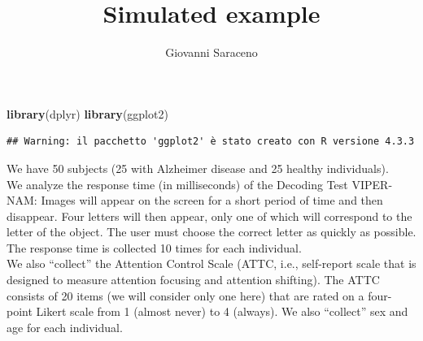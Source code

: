 \documentclass[
]{article}
\title{Simulated example}
\author{Giovanni Saraceno}
\date{}
\newenvironment{Shaded}{\begin{snugshade}}{\end{snugshade}}
\newcommand{\FunctionTok}[1]{\textcolor[rgb]{0.13,0.29,0.53}{\textbf{#1}}}
\newcommand{\NormalTok}[1]{#1}
\begin{document}
\maketitle

{
\setcounter{tocdepth}{2}
\tableofcontents
}
\begin{Shaded}
\begin{Highlighting}[]
\FunctionTok{library}\NormalTok{(dplyr)}
\FunctionTok{library}\NormalTok{(ggplot2)}
\end{Highlighting}
\end{Shaded}

\begin{verbatim}
## Warning: il pacchetto 'ggplot2' è stato creato con R versione 4.3.3
\end{verbatim}

We have 50 subjects (25 with Alzheimer disease and 25 healthy
individuals).\\
We analyze the response time (in milliseconds) of the Decoding Test
VIPER-NAM: Images will appear on the screen for a short period of time
and then disappear. Four letters will then appear, only one of which
will correspond to the letter of the object. The user must choose the
correct letter as quickly as possible. The response time is collected 10
times for each individual.\\
We also ``collect'' the Attention Control Scale (ATTC, i.e., self-report
scale that is designed to measure attention focusing and attention
shifting). The ATTC consists of 20 items (we will consider only one
here) that are rated on a four-point Likert scale from 1 (almost never)
to 4 (always). We also ``collect'' sex and age for each individual.
\end{document}
